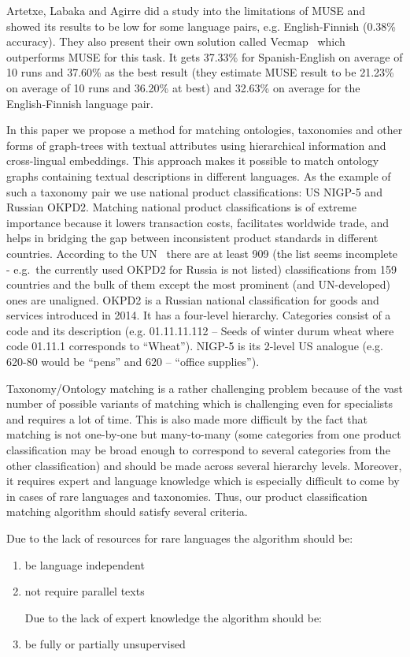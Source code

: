 \documentclass[11pt,a4paper]{article}
\begin{document}
Artetxe, Labaka and Agirre did a study into the limitations of MUSE and showed its results to be low for some language pairs, e.g. English-Finnish (0.38\% accuracy). They also present their own solution called Vecmap~\cite{vecmap} which outperforms MUSE for this task. It gets 37.33\% for Spanish-English on average of 10 runs and 37.60\% as the best result (they estimate MUSE result to be 21.23\% on average of 10 runs and 36.20\% at best) and 32.63\% on average for the English-Finnish language pair.

In this paper we propose a method for matching ontologies, taxonomies and other forms of graph-trees with textual attributes using hierarchical information and cross-lingual embeddings. This approach makes it possible to match ontology graphs containing textual descriptions in different languages. As the example of such a taxonomy pair we use national product classifications: US NIGP-5 and Russian OKPD2. Matching national product classifications is of extreme importance because it lowers transaction costs, facilitates worldwide trade, and helps in bridging the gap between inconsistent product standards in different countries. According to the UN~\cite{unsd} there are at least 909 (the list seems incomplete - e.g.\ the currently used OKPD2 for Russia is not listed) classifications from 159 countries and the bulk of them except the most prominent (and UN-developed) ones are unaligned. OKPD2 is a Russian national classification for goods and services introduced in 2014. It has a four-level hierarchy. Categories consist of a code and its description (e.g. 01.11.11.112 -- Seeds of winter durum wheat where code 01.11.1 corresponds to ``Wheat''). NIGP-5 is its 2-level US analogue (e.g. 620-80 would be ``pens'' and 620 -- ``office supplies'').

Taxonomy/Ontology matching is a rather challenging problem because of the vast number of possible variants of matching which is challenging even for specialists and requires a lot of time. This is also made more difficult by the fact that matching is not one-by-one but many-to-many (some categories from one product classification may be broad enough to correspond to several categories from the other classification) and should be made across several hierarchy levels. Moreover, it requires expert and language knowledge which is especially difficult to come by in cases of rare languages and taxonomies. Thus, our product classification matching algorithm should satisfy several criteria.

Due to the lack of resources for rare languages	the algorithm should be:
\begin{enumerate}

	\item be language independent

	\item not require parallel texts


	Due to the lack of expert knowledge the algorithm should be:

	\item be fully or partially unsupervised
\end{enumerate}
\end{document}
